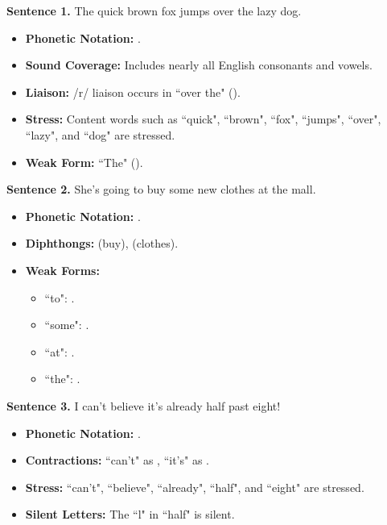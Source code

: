 \begin{description}
    \item \textbf{Sentence 1.} The quick brown fox jumps over the lazy dog.
    \begin{itemize}
        \item \textbf{Phonetic Notation:} .
        \item \textbf{Sound Coverage:} Includes nearly all English consonants and vowels.
        \item \textbf{Liaison:} /r/ liaison occurs in ``over the" ().
        \item \textbf{Stress:} Content words such as ``quick", ``brown", ``fox", ``jumps", ``over", ``lazy", and ``dog" are stressed.
        \item \textbf{Weak Form:} ``The" ().
    \end{itemize}

    \item \textbf{Sentence 2.} She's going to buy some new clothes at the mall.
    \begin{itemize}
        \item \textbf{Phonetic Notation:} .
        \item \textbf{Diphthongs:}  (buy),  (clothes).
        \item \textbf{Weak Forms:} 
            \begin{itemize}
                \item ``to": .
                \item ``some": .
                \item ``at": .
                \item ``the": .
            \end{itemize}
    \end{itemize}

    \item \textbf{Sentence 3.} I can't believe it's already half past eight!
    \begin{itemize}
        \item \textbf{Phonetic Notation:} .
        \item \textbf{Contractions:} ``can't" as , ``it's" as .
        \item \textbf{Stress:} ``can't", ``believe", ``already", ``half", and ``eight" are stressed.
        \item \textbf{Silent Letters:} The ``l" in ``half" is silent.
    \end{itemize}


\end{description}
